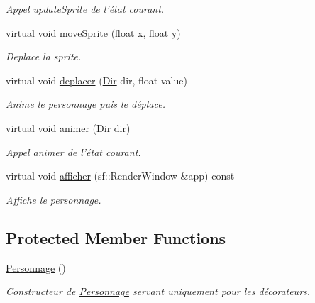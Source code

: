 \begin{DoxyCompactItemize}
\begin{DoxyCompactList}\small\item\em Appel update\-Sprite de l'état courant. \end{DoxyCompactList}\item 
virtual void \hyperlink{classPersonnage_a00ef4a38996c6c020ed3aa1e4d65098d}{move\-Sprite} (float x, float y)
\begin{DoxyCompactList}\small\item\em Deplace la sprite. \end{DoxyCompactList}\item 
virtual void \hyperlink{classPersonnage_a99480aca193d012d344aceaf6742e7fe}{deplacer} (\hyperlink{Espace_8h_a7cf6e8c5a5bc5e7b2afef3647870b1c4}{Dir} dir, float value)
\begin{DoxyCompactList}\small\item\em Anime le personnage puis le déplace. \end{DoxyCompactList}\item 
virtual void \hyperlink{classPersonnage_a8feaa72a18a1bc177d1c70c9a6c71cb3}{animer} (\hyperlink{Espace_8h_a7cf6e8c5a5bc5e7b2afef3647870b1c4}{Dir} dir)
\begin{DoxyCompactList}\small\item\em Appel animer de l'état courant. \end{DoxyCompactList}\item 
virtual void \hyperlink{classPersonnage_a320cb07fb55be9eaeee82b6f39f231d8}{afficher} (sf\-::\-Render\-Window \&app) const 
\begin{DoxyCompactList}\small\item\em Affiche le personnage. \end{DoxyCompactList}\end{DoxyCompactItemize}
\subsection*{Protected Member Functions}
\begin{DoxyCompactItemize}
\item 
\hypertarget{classPersonnage_abec36eb0310adc71f3375297fc590c65}{\hyperlink{classPersonnage_abec36eb0310adc71f3375297fc590c65}{Personnage} ()}\label{classPersonnage_abec36eb0310adc71f3375297fc590c65}

\begin{DoxyCompactList}\small\item\em Constructeur de \hyperlink{classPersonnage}{Personnage} servant uniquement pour les décorateurs. \end{DoxyCompactList}\end{DoxyCompactItemize}
